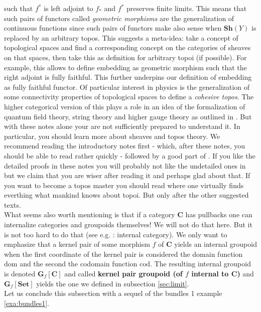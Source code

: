 such that $f^{\ast}$ is left adjoint to $f_{\ast}$ and $f^{\ast}$ preserves finite limits. This means that such pairs of functors called \textit{geometric morphisms} are the generalization of continuous functions since such pairs of functors make also sense when $\mathbf{Sh}(Y)$ is replaced by an arbitrary topos. This suggests a meta-idea: take a concept of topological spaces and find a corresponding concept on the categories of sheaves on that spaces, then take this as definition for arbitrary topoi (if possible). For example, this allows to define embedding as geometric morphism such that the right adjoint is fully faithful. This further underpins our definition of embedding as fully faithful functor. Of particular interest in physics is the generalization of some connectivity properties of topological spaces to define a \textit{cohesive topos}. The higher categorical version of this plays a role in an idea of the formalization of quantum field theory, string theory and higher gauge theory as outlined in \cite{a565d200}. But with these notes alone your are not sufficiently prepared to understand it. In particular, you should learn more about sheaves and topos theory. We recommend reading the introductory notes \cite{de9b9402} first - which, after these notes, you should be able to read rather quickly - followed by a good part of \cite{c55c71e8}. If you like the detailed proofs in these notes you will probably not like the undetailed ones in \cite{c55c71e8} but we claim that you are wiser after reading it and perhaps glad about that. If you want to become a topos master you should read \cite{c1f00dad} where one virtually finds everthing what mankind knows about topoi. But only after the other suggested texts.
\\
What seems also worth mentioning is that if a category $\mathbf{C}$ has pullbacks one can internalize categories and groupoids themselves! We will not do that here. But it is not too hard to do that (see e.g. \cite{wiki-nlab0000}: internal category). We only want to emphasize that a kernel pair of some morphism $f$ of $\mathbf{C}$ yields an internal groupoid when the first coordinate of the kernel pair is considered the domain function $\mathrm{dom}$ and the second the codomain function $\mathrm{cod}$. The resulting internal groupoid is denoted $\mathbf{G}_{f}[\mathbf{C}]$ and called \textbf{kernel pair groupoid (of $f$ internal to $\mathbf{C}$)} and $\mathbf{G}_{f}[\mathbf{Set}]$ yields the one we defined in subsection \ref{sec:limit}.
\\
Let us conclude this subsection with a sequel of the bundles 1 example \ref{exa:bundles1}.
